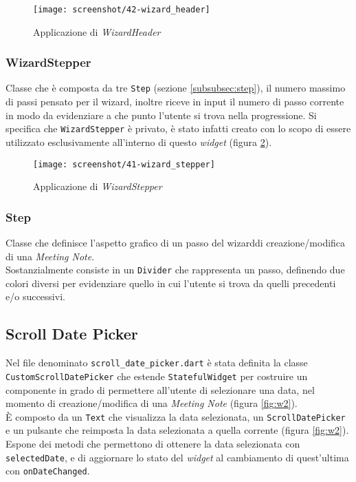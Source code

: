 \begin{figure}[!h] 
    \centering 
    \texttt{[image: screenshot/42-wizard\_header]} 
    \caption{Applicazione di \emph{WizardHeader}}
    \label{fig:wizard-header}
\end{figure}

\subsubsection*{WizardStepper}
\label{subsubsec:wizard-stepper}

Classe che è composta da tre \lstinline{Step} (sezione \ref{subsubsec:step}), il numero massimo di passi pensato per il \gls{wizard}\glsoccur, inoltre riceve in input il numero di passo corrente in modo da evidenziare a che punto l'utente si trova nella progressione.
Si specifica che \lstinline{WizardStepper} è privato, è stato infatti creato con lo scopo di essere utilizzato esclusivamente all'interno di questo \emph{widget} (figura \ref{fig:wizard-stepper}).\\

\begin{figure}[!h] 
    \centering 
    \texttt{[image: screenshot/41-wizard\_stepper]} 
    \caption{Applicazione di \emph{WizardStepper}}
    \label{fig:wizard-stepper}
\end{figure}

\subsubsection*{Step}
\label{subsubsec:step}

Classe che definisce l'aspetto grafico di un passo del \gls{wizard}\glsoccur di creazione/modifica di una \emph{Meeting Note}.\\
Sostanzialmente consiste in un \lstinline{Divider}\cite{site:divider} che rappresenta un passo, definendo due colori diversi per evidenziare quello in cui l'utente si trova da quelli precedenti e/o successivi.

\subsection{Scroll Date Picker}
\label{subsec:scroll-date-picker}

Nel file denominato \lstinline{scroll_date_picker.dart} è stata definita la classe \lstinline{CustomScrollDatePicker} che estende \lstinline{StatefulWidget} per costruire un componente in grado di permettere all'utente di selezionare una data, nel momento di creazione/modifica di una \emph{Meeting Note} (figura \ref{fig:w2}).\\
È composto da un \lstinline{Text}\cite{site:text} che visualizza la data selezionata, un \lstinline{ScrollDatePicker}\cite{site:scroll-date-picker} e un pulsante che reimposta la data selezionata a quella corrente (figura \ref{fig:w2}).\\
Espone dei metodi che permettono di ottenere la data selezionata con \lstinline{selectedDate}, e di aggiornare lo stato del \emph{widget} al cambiamento di quest'ultima con \lstinline{onDateChanged}.

